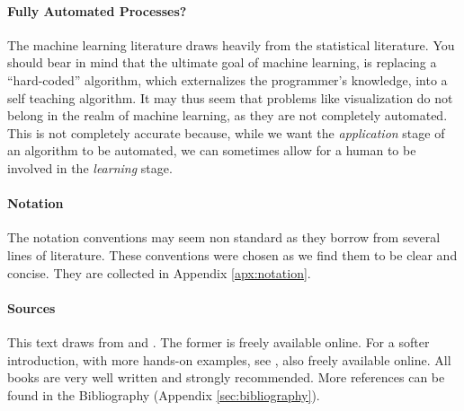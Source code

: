 \paragraph{Fully Automated Processes?}
The machine learning literature draws heavily from the statistical literature. 
You should bear in mind that the ultimate goal of machine learning, is replacing a ``hard-coded'' algorithm, which externalizes the programmer's knowledge, into a self teaching algorithm. 
It may thus seem that problems like visualization do not belong in the realm of machine learning, as they are not completely automated.
This is not completely accurate because, while we want the \emph{application} stage of an algorithm to be automated, we can sometimes allow for a human to be involved in the \emph{learning} stage. 


\paragraph{Notation}
The notation conventions may seem non standard as they borrow from several lines of literature. 
These conventions were chosen as we find them to be clear and concise.
They are collected in Appendix \ref{apx:notation}.

\paragraph{Sources}
This text draws from \cite{hastie_elements_2003} and \cite{shalev-shwartz_understanding_2014}.
The former is freely available online.
For a softer introduction, with more hands-on examples, see \cite{james_introduction_2013}, also freely available online.
All books are very well written and strongly recommended.
More references can be found in the Bibliography (Appendix \ref{sec:bibliography}).


